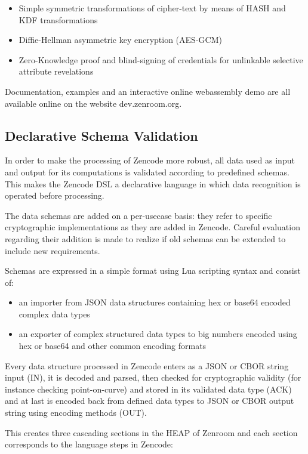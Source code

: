 \documentclass{svproc}
\begin{document}
\begin{itemize}
\item Simple symmetric transformations of cipher-text by means of HASH and KDF transformations
\item Diffie-Hellman asymmetric key encryption (AES-GCM)
\item Zero-Knowledge proof and blind-signing of credentials for unlinkable selective attribute revelations
\end{itemize}

Documentation, examples and an interactive online webassembly demo
are all available online on the website dev.zenroom.org.

\subsection{Declarative Schema Validation}

In order to make the processing of Zencode more robust, all data used
as input and output for its computations is validated according to
predefined schemas. This makes the Zencode DSL a declarative language
in which data recognition is operated before processing.

The data schemas are added on a per-usecase basis: they refer to
specific cryptographic implementations as they are added in
Zencode. Careful evaluation regarding their addition is made to
realize if old schemas can be extended to include new requirements.

Schemas are expressed in a simple format using Lua scripting syntax
and consist of:
\begin{itemize}
\item an importer from JSON data structures containing hex or base64 encoded complex data types
\item an exporter of complex structured data types to big numbers encoded using hex or base64 and other common encoding formats
\end{itemize}

Every data structure processed in Zencode enters as a JSON or CBOR
string input (IN), it is decoded and parsed, then checked for
cryptographic validity (for instance checking point-on-curve) and
stored in its validated data type (ACK) and at last is encoded back
from defined data types to JSON or CBOR output string using encoding
methods (OUT).

This creates three cascading sections in the HEAP of Zenroom and each
section corresponds to the language steps in Zencode:
\end{document}
